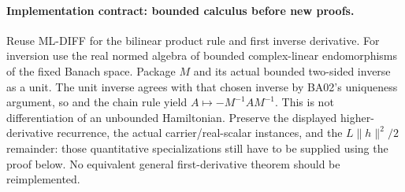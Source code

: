 \documentclass[11pt,a4paper]{article}
\theoremstyle{remark}\newtheorem{remark}[theorem]{Remark}
\begin{document}
\paragraph{Implementation contract: bounded calculus before new proofs.}
Reuse ML-DIFF for the bilinear product rule and first inverse derivative. For inversion use the real normed algebra of bounded complex-linear endomorphisms of the fixed Banach space. Package $M$ and its actual bounded two-sided inverse as a unit. The unit inverse agrees with that chosen inverse by BA02's uniqueness argument, so  and the chain rule yield $A\mapsto-M^{-1}AM^{-1}$. This is not differentiation of an unbounded Hamiltonian. Preserve the displayed higher-derivative recurrence, the actual carrier/real-scalar instances, and the $L\|h\|^2/2$ remainder: those quantitative specializations still have to be supplied using the proof below. No equivalent general first-derivative theorem should be reimplemented.
\end{document}
